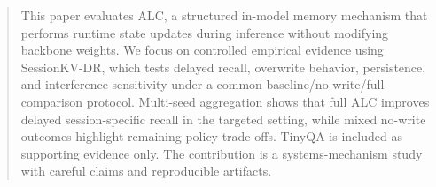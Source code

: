 \begin{abstract}
This paper evaluates ALC, a structured in-model memory mechanism that performs runtime state updates during inference without modifying backbone weights. We focus on controlled empirical evidence using SessionKV-DR, which tests delayed recall, overwrite behavior, persistence, and interference sensitivity under a common baseline/no-write/full comparison protocol. Multi-seed aggregation shows that full ALC improves delayed session-specific recall in the targeted setting, while mixed no-write outcomes highlight remaining policy trade-offs. TinyQA is included as supporting evidence only. The contribution is a systems-mechanism study with careful claims and reproducible artifacts.
\end{abstract}
